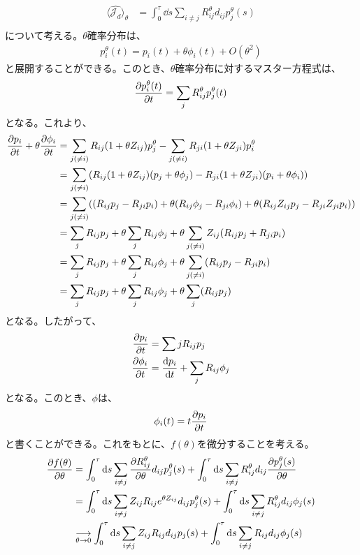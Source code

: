 \documentclass[a4paper,11pt]{jsarticle}
\numberwithin{equation}{section}
\begin{document}
\begin{align}
    \langle \hat{\mathcal{J}_d} \rangle_\theta &=\int_0^\tau \dd{s} \sum_{i \neq j} R_{ij}^{\theta}d_{ij}p_j^{\theta}(s)\\
\end{align}
について考える。$\theta$確率分布は、
\begin{align}
    p_{i}^{\theta}(t) = p_{i}(t) + \theta \phi_{i}(t) + O(\theta^2)
\end{align}
と展開することができる。このとき、$\theta$確率分布に対するマスター方程式は、
\begin{align}
    \pdv{p_{i}^{\theta}(t)}{t} = \sum_{j} R_{ij}^{\theta}p_{j}^{\theta}(t) 
\end{align}
となる。これより、
\begin{align}
    \pdv{p_{i}}{t} + \theta \pdv{\phi_{i}}{t} &=\sum_{j(\neq i)} R_{ij}(1 + \theta Z_{ij})p_{j}^{\theta} - \sum_{j(\neq i)} R_{ji}(1 + \theta Z_{ji})p_{i}^{\theta} \\
    &= \sum_{j(\neq i)} (R_{ij}(1 + \theta Z_{ij})(p_{j} + \theta \phi_{j}) - R_{ji}(1 + \theta Z_{ji})(p_{i} + \theta \phi_{i}))\\
    &= \sum_{j(\neq i)} ((R_{ij}p_{j} - R_{ji}p_{i}) + \theta(R_{ij}\phi_{j}-R_{ji}\phi_{i})+ \theta(R_{ij}Z_{ij}p_{j} - R_{ji}Z_{ji}p_{i}))\\
    &= \sum_{j} R_{ij}p_{j} + \theta \sum_{j} R_{ij}\phi_{j} + \theta \sum_{j(\neq i)} Z_{ij}(R_{ij}p_{j} + R_{ji}p_{i})\\
    &= \sum_{j} R_{ij}p_{j} + \theta \sum_{j} R_{ij}\phi_{j} + \theta \sum_{j(\neq i)} (R_{ij}p_{j} - R_{ji}p_{i})\\
    &= \sum_{j} R_{ij}p_{j} + \theta \sum_{j} R_{ij}\phi_{j} + \theta \sum_{j} (R_{ij}p_{j})
\end{align}
となる。したがって、
\begin{align}
    \pdv{p_{i}}{t} &= \sum{j} R_{ij}p_{j}\\
    \pdv{\phi_{i}}{t} &= \dv{p_{i}}{t} + \sum_{j} R_{ij}\phi_{j}
\end{align}
となる。このとき、$\phi$は、
\begin{align}
    \phi_{i}(t) = t\pdv{p_{i}}{t} 
\end{align}
と書くことができる。これをもとに、$f(\theta)$を微分することを考える。
\begin{align}
    \pdv{f(\theta)}{\theta} &= \int_0^\tau \dd{s} \sum_{i \neq j} \pdv{R_{ij}^{\theta}}{\theta}d_{ij}p_j^{\theta}(s) + \int_0^\tau \dd{s} \sum_{i \neq j} R_{ij}^{\theta}d_{ij}\pdv{p_j^{\theta}(s)}{\theta}\\
    &= \int_0^\tau \dd{s} \sum_{i \neq j}Z_{ij} R_{ij}e^{\theta Z_{ij}}d_{ij}p_j^{\theta}(s) + \int_0^\tau \dd{s} \sum_{i \neq j} R_{ij}^{\theta}d_{ij}\phi_j(s)\\
    &\underset{\theta \to 0}{\longrightarrow} \int_0^\tau \dd{s} \sum_{i \neq j} Z_{ij}R_{ij}d_{ij}p_j(s) + \int_0^\tau \dd{s} \sum_{i \neq j} R_{ij}d_{ij}\phi_j(s)
\end{align}
\end{document}
